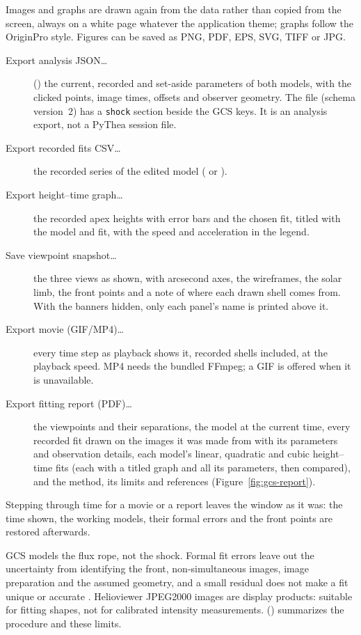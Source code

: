 Images and graphs are drawn again from the data rather than copied from the screen, always on
a white page whatever the application theme; graphs follow the OriginPro style. Figures can be
saved as PNG, PDF, EPS, SVG, TIFF or JPG.
\begin{description}
  \item[Export analysis JSON…] () the current, recorded and set-aside
    parameters of both models, with the clicked points, image times, offsets and observer
    geometry. The file (schema version~2) has a \texttt{shock} section beside the GCS keys. It
    is an analysis export, not a PyThea session file.
  \item[Export recorded fits CSV…] the recorded series of the edited model
    ( or ).
  \item[Export height–time graph…] the recorded apex heights with error bars and the chosen
    fit, titled with the model and fit, with the speed and acceleration in the legend.
  \item[Save viewpoint snapshot…] the three views as shown, with arcsecond axes, the
    wireframes, the solar limb, the front points and a note of where each drawn shell comes
    from. With the banners hidden, only each panel's name is printed above it.
  \item[Export movie (GIF/MP4)…] every time step as playback shows it, recorded shells
    included, at the playback speed. MP4 needs the bundled FFmpeg; a GIF is offered when it is
    unavailable.
  \item[Export fitting report (PDF)…] the viewpoints and their separations, the model at the
    current time, every recorded fit drawn on the images it was made from with its parameters
    and observation details, each model's linear, quadratic and cubic height--time fits (each
    with a titled graph and all its parameters, then compared), and the method, its limits and
    references (Figure~\ref{fig:gcs-report}).
\end{description}
Stepping through time for a movie or a report leaves the window as it was: the time shown, the
working models, their formal errors and the front points are restored afterwards.


\begin{caution}
  GCS models the flux rope, not the shock. Formal fit errors leave out the uncertainty from
  identifying the front, non-simultaneous images, image preparation and the assumed geometry,
  and a small residual does not make a fit unique or accurate \parencite{verbeke2023}. Helioviewer
  JPEG2000 images are display products: suitable for fitting shapes, not for calibrated
  intensity measurements.  ()
  summarizes the procedure and these limits.
\end{caution}
